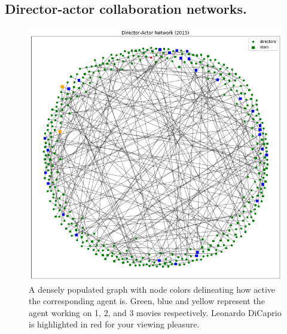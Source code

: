\documentclass{article}
\begin{document}
\subsection{Director-actor collaboration networks.}

\begin{figure}
    \centering
    \includegraphics[scale=0.35]{Director_Actor_Network_2015.png}
    \caption{A densely populated graph with node colors delineating how active the corresponding agent is. Green, blue and yellow represent the agent working on 1, 2, and 3 movies respectively. Leonardo DiCaprio is highlighted in red for your viewing pleasure.}
    \label{fig:t-graph-fig}
\end{figure}
\end{document}
